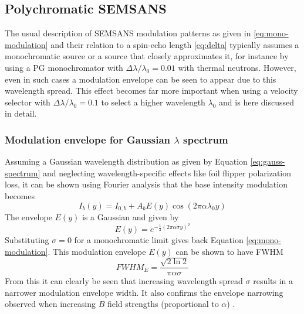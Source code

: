 \documentclass{article}
\begin{document}
\subsection{Polychromatic SEMSANS}
\label{c3.6}
The usual description of SEMSANS modulation patterns as given in \eqref{eq:mono-modulation} and their relation to a spin-echo length \eqref{eq:delta} typically assumes a monochromatic source or a source that closely approximates it, for instance by using a PG monochromator with $\Delta\lambda/\lambda_0 = 0.01$ with thermal neutrons. However, even in such cases a modulation envelope can be seen to appear \cite{bouwman2021} due to this wavelength spread. This effect becomes far more important when using a velocity selector with $\Delta\lambda/\lambda_0 = 0.1$ to select a higher wavelength $\lambda_0$ and is here discussed in detail.
\subsubsection{Modulation envelope for Gaussian $\lambda$ spectrum}
Assuming a Gaussian wavelength distribution as given by Equation \eqref{eq:gauss-spectrum} and neglecting wavelength-specific effects like foil flipper polarization loss, it can be shown using Fourier analysis that the base intensity modulation becomes
\begin{equation}
	I_b(y) = I_{0,b} + A_bE(y)\cos(2\pi\alpha\lambda_0y) \label{eq:poly-base-modulation}
\end{equation}
The envelope $E(y)$ is a Gaussian and given by
\begin{equation}
	E(y) = e^{-\frac{1}{2}\left(2\pi\alpha\sigma y\right)^2} \label{eq:poly-base-modulation-env}
\end{equation}
Substituting $\sigma=0$ for a monochromatic limit gives back Equation \eqref{eq:mono-modulation}. This modulation envelope $E(y)$ can be shown to have FWHM 
\begin{equation}
	FWHM_E = \frac{\sqrt{2\ln 2}}{\pi\alpha\sigma} \label{eq:poly-base-modulation-fwhm}
\end{equation}
From this it can clearly be seen that increasing wavelength spread $\sigma$ results in a narrower modulation envelope width. It also confirms the envelope narrowing observed when increasing $B$ field strengths (proportional to $\alpha$) \cite{bouwman2021}. 
\end{document}
